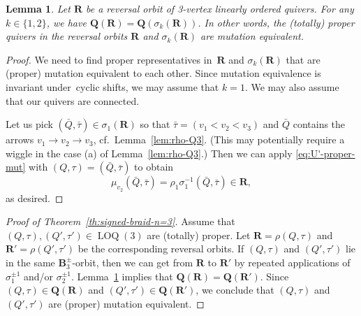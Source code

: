 \documentclass[11pt, letterpaper]{amsart}
\newtheorem{lemma}[theorem]{Lemma}
\theoremstyle{definition}
\numberwithin{equation}{section}
\newcommand\LOQ{\operatorname{LOQ}}
\begin{document}

\begin{lemma}
\label{lem:sigma-reversal-orbit}
Let $\mathbf{R}$ be a reversal orbit of 3-vertex linearly ordered quivers.
For any $k\in\{1,2\}$, we have $\mathbf{Q}(\mathbf{R})=\mathbf{Q}(\sigma_k(\mathbf{R}))$. 
In other words, the (totally) proper quivers in the reversal orbits $\mathbf{R}$ and
$\sigma_k(\mathbf{R})$ are mutation equivalent. 
\end{lemma}

\begin{proof}
We need to find proper representatives in~$\mathbf{R}$
and $\sigma_k(\mathbf{R})$
that are (proper) mutation equivalent to each other. 
Since mutation equivalence is invariant under~cyclic shifts, we may assume that $k=1$. 
We may also assume that our quivers are connected. 

Let us pick $(\bar Q, \bar\tau)\in\sigma_1(\mathbf{R})$  
so that $\bar\tau=(v_1<v_2<v_3)$ and $\bar Q$ contains the arrows $v_1\to v_2\to v_3$,
cf.\ Lemma~\ref{lem:rho-Q3}. 
(This may potentially require a wiggle in the case (a) of Lemma~\ref{lem:rho-Q3}.)
Then we can apply \eqref{eq:U'-proper-mut} with $(Q,\tau)=(\bar Q,\bar\tau)$ to obtain 
\begin{equation*}
\mu_{v_2}(\bar Q,\bar \tau) = \rho_1 \sigma_1^{-1}(\bar Q,\bar\tau) \in \mathbf{R},
\end{equation*}
as desired. 
\end{proof}

\pagebreak[3]

\begin{proof}[Proof of Theorem~\ref{th:signed-braid-n=3}]
Assume that $(Q,\tau),(Q',\tau')\in\LOQ(3)$ are (totally) proper.
Let $\mathbf{R}=\rho(Q,\tau)$ and $\mathbf{R}'=\rho(Q',\tau')$ 
be the corresponding reversal orbits. 
If $(Q,\tau)$ and $(Q',\tau')$
lie in the same $\mathbf{B}_3^{\pm}$-orbit, then we can get from $\mathbf{R}$ to $\mathbf{R}'$
by repeated applications of $\sigma_1^{\pm1}$ and/or $\sigma_2^{\pm1}$. 
Lemma~\ref{lem:sigma-reversal-orbit} implies that $\mathbf{Q}(\mathbf{R})=\mathbf{Q}(\mathbf{R}')$. 
Since $(Q,\tau)\in\mathbf{Q}(\mathbf{R})$ and $(Q',\tau')\in\mathbf{Q}(\mathbf{R'})$, 
we conclude that $(Q,\tau)$ and $(Q',\tau')$ are (proper) mutation equivalent. 
\end{proof}
\end{document}
